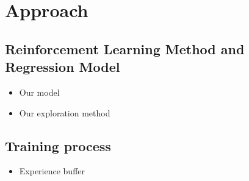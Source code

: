 \section{Approach} 
\label{approach}

\subsection{Reinforcement Learning Method and Regression Model} 
\label{ch:approachA}


\begin{itemize}
	\item Our model
	\item Our exploration method
\end{itemize}

\subsection{Training process} 
\label{ch:approachB}

\begin{itemize}
	\item Experience buffer
\end{itemize}